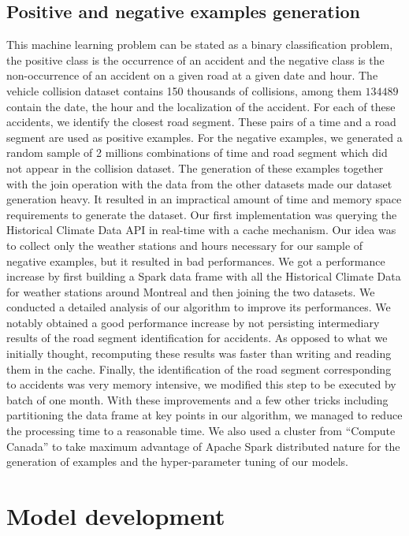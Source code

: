 \documentclass[conference]{IEEEtran}
\begin{document}
\subsection{Positive and negative examples generation}
This machine learning problem can be stated as a binary classification problem, the positive class is the occurrence of an accident and the negative class is the non-occurrence of an accident on a given road at a given date and hour.
The vehicle collision dataset contains 150 thousands of collisions, among them $134 489$ contain the date, the hour and the localization of the accident.
For each of these accidents, we identify the closest road segment.
These pairs of a time and a road segment are used as positive examples.
For the negative examples, we generated a random sample of 2 millions combinations of time and road segment which did not appear in the collision dataset.
 The generation of these examples together with the join operation with the data from the other datasets made our dataset generation heavy.
It resulted in an impractical amount of time and memory space requirements to generate the dataset.
Our first implementation was querying the Historical Climate Data API in real-time with a cache mechanism.
Our idea was to collect only the weather stations and hours necessary for our sample of negative examples, but it resulted in bad performances.
We got a performance increase by first building a Spark data frame with all the Historical Climate Data for weather stations around Montreal and then joining the two datasets.
We conducted a detailed analysis of our algorithm to improve its performances.
We notably obtained a good performance increase by not persisting intermediary results of the road segment identification for accidents.
As opposed to what we initially thought, recomputing these results was faster than writing and reading them in the cache.
Finally, the identification of the road segment corresponding to accidents was very memory intensive, we modified this step to be executed by batch of one month.
 With these improvements and a few other tricks including partitioning the data frame at key points in our algorithm, we managed to reduce the processing time to a reasonable time.
We also used a cluster from “Compute Canada” to take maximum advantage of Apache Spark distributed nature for the generation of examples and the hyper-parameter tuning of our models.


\section{Model development}
\end{document}
